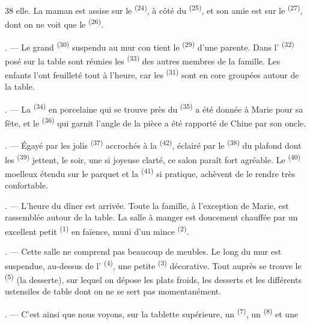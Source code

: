 \begin{VUpage}[40]{38}
\VUcontinue
elle. La maman est assise sur le  \textsuperscript{(24)}, à côté\nl
du  \textsuperscript{(25)}, et son amie est sur le  \textsuperscript{(27)}, dont\nl
on ne voit que le  \textsuperscript{(26)}.

. --- Le grand  \textsuperscript{(30)} suspendu au mur con\cc
tient le  \textsuperscript{(29)} d'une parente. Dans l' \textsuperscript{(32)}\nl
posé sur la table sont réunies les  \textsuperscript{(33)}\nl
des autres membres de la famille. Les enfants l'ont\nl
feuilleté tout à l'heure, car les  \textsuperscript{(31)} sont en\cc
core groupées autour de la table.

. --- La  \textsuperscript{(34)} en porcelaine qui se trouve\nl
près du  \textsuperscript{(35)} a été donnée à Marie pour\nl
sa fête, et le  \textsuperscript{(36)} qui garnit l'angle de la\nl
pièce a été rapporté de Chine par son oncle.

. --- Égayé par les jolis  \textsuperscript{(37)} accrochés\nl
à la  \textsuperscript{(42)}, éclairé par le  \textsuperscript{(38)} du plafond\nl
dont les  \textsuperscript{(39)} jettent, le soir, une\nl
si joyeuse clarté, ce salon paraît fort agréable. Le\nl
{} \textsuperscript{(40)} moelleux étendu sur le parquet et la \cc
{} \textsuperscript{(41)} si pratique, achèvent de le\nl
rendre très confortable.

\VUsaut{3.0mm}
\VUsaut{3.0mm}

. --- L'heure du dîner est arrivée. Toute la famille,\nl
à l'exception de Marie, est rassemblée autour de la\nl
table. La salle à manger est doucement chauffée par\nl
un excellent petit  \textsuperscript{(1)} en faïence, muni d'un\nl
mince  \textsuperscript{(2)}.

. --- Cette salle ne comprend pas beaucoup de\nl
meubles. Le long du mur est suspendue, au-dessus\nl
de l' \textsuperscript{(4)}, une petite  \textsuperscript{(3)} décorative.\nl
Tout auprès se trouve le  \textsuperscript{(5)} (la desserte),\nl
sur lequel on dépose les plats froids, les desserts et\nl
les différents ustensiles de table dont on ne se sert\nl
pas momentanément.

. --- C'est ainsi que nous voyons, sur la tablette\nl
supérieure, un  \textsuperscript{(7)}, un  \textsuperscript{(8)} et une
\parplein
\end{VUpage}


